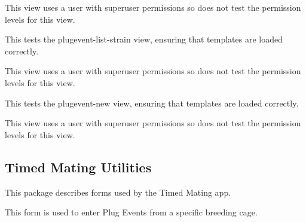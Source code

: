 \documentclass[letterpaper,10pt,english]{sphinxmanual}
\begin{document}
\begin{fulllineitems}
\begin{fulllineitems}
This view uses a user with superuser permissions so does not test the permission levels for this view.

\end{fulllineitems}


\begin{fulllineitems}
\label{timed_mating:mousedb.timed_mating.tests.Timed_MatingViewTests.test_plugevent_list_strain}
This tests the plugevent-list-strain view, ensuring that templates are loaded correctly.

This view uses a user with superuser permissions so does not test the permission levels for this view.

\end{fulllineitems}


\begin{fulllineitems}
\label{timed_mating:mousedb.timed_mating.tests.Timed_MatingViewTests.test_plugevent_new}
This tests the plugevent-new view, ensuring that templates are loaded correctly.

This view uses a user with superuser permissions so does not test the permission levels for this view.

\end{fulllineitems}


\end{fulllineitems}



\subsection{Timed Mating Utilities}
\label{timed_mating:timed-mating-utilities}\label{timed_mating:module-mousedb.timed_mating.forms}
This package describes forms used by the Timed Mating app.

\begin{fulllineitems}
\label{timed_mating:mousedb.timed_mating.forms.BreedingPlugForm}
This form is used to enter Plug Events from a specific breeding cage.

\end{fulllineitems}
\end{document}
